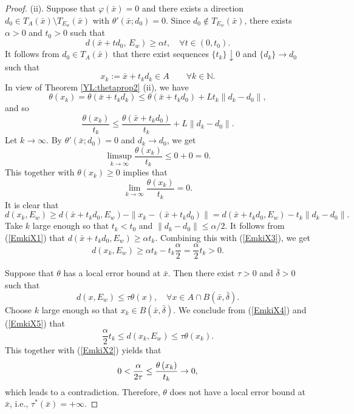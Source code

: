 \documentclass[11pt]{article}
\begin{document}
\begin{proof}
  
  (ii).    Suppose that $	\varphi(\bar{x}) = 0$ and there exists a direction $d_0\in T_A(\bar{x})\setminus T_{E_w}(\bar{x})$ with $\theta'(\bar{x};d_0)=0$. 
  Since $d_0\notin T_{E_w}(\bar{x})$,    there exists  $\alpha>0$ and $t_0>0$ such that
\begin{equation}\label{EmkiX1}
 d(\bar{x}+td_0,\,E_w) \ge \alpha t,    \quad   \forall t\in(0,t_0).
 \end{equation}
It follows from $d_0\in T_A(\bar{x})$ that    there exist sequences $\{t_k\}\downarrow 0$ and $\{d_k\}\to d_0$ such that
  \[
  x_k := \bar{x}+t_k d_k \in A\qquad   \forall k\in\mathbb{N}.  
  \]
   In view of Theorem   \ref{YL:thetaprop2} (ii),  we have
  \[
  \theta(x_k) = \theta(\bar{x}+t_k d_k) \le \theta(\bar{x}+t_k d_0) + L t_k \|d_k - d_0\|,
  \]
and so
  \[
  \frac{\theta(x_k)}{t_k} \le \frac{\theta(\bar{x}+t_k d_0)}{t_k} + L \|d_k - d_0\|.
  \]
  Let $k\to\infty$.  By   $\theta'(\bar{x};d_0)=0$ and $d_k\to d_0$, we get
  \[
  \limsup_{k\to\infty} \frac{\theta(x_k)}{t_k} \le 0 + 0 = 0.
  \]
  This together with $\theta(x_k) \ge 0$   implies that
  \begin{equation}\label{EmkiX2}
  	\lim_{k\to\infty} \frac{\theta(x_k)}{t_k} = 0.
  \end{equation}
    It is clear that
   \begin{equation}\label{EmkiX3}
  d(x_k, E_w) \ge d(\bar{x}+t_k d_0, E_w) - \|x_k - (\bar{x}+t_k d_0)\| = d(\bar{x}+t_k d_0, E_w) - t_k \|d_k - d_0\|.
   \end{equation}
  Take $k$ large enough so that $t_k < t_0$ and $\|d_k - d_0\| \le \alpha/2$.    It follows from  (\ref{EmkiX1})  that  $d(\bar{x}+t_k d_0, E_w) \ge \alpha t_k$.  Combining this with  (\ref{EmkiX3}), we get
   \begin{equation}\label{EmkiX4}
  d(x_k, E_w) \ge \alpha t_k - t_k\frac{\alpha}{2} = \frac{\alpha}{2} t_k > 0.  
   \end{equation}
  
 Suppose that $\theta$ has a  local error bound at $\bar x$.
  Then  there exist $\tau>0$ and $\bar{\delta } >0$ such that
   \begin{equation}\label{EmkiX5}
d(x,E_w)\le \tau\theta(x),   \quad  \forall x\in A\cap B(\bar{x},\bar{\delta }).
 \end{equation}
 Choose $k$ large enough so that $x_k\in B(\bar{x},\bar{\delta })$.   We conclude from  (\ref{EmkiX4})  and  (\ref{EmkiX5})  that
  \[
  \frac{\alpha}{2} t_k \le d(x_k, E_w) \le \tau \theta(x_k) .
  \]
  This together with    (\ref{EmkiX2})    yields   that 
  $$ 0 < {\alpha  \over 2 \tau} \le {{   \theta \left( {{x_k}} \right)} \over {{t_k}}} \to 0,$$
which leads to a contradiction.  Therefore, $\theta$ does not have a local error bound at $\bar{x}$, i.e., $\tau^*(\bar{x}) = +\infty$.
     \end{proof}  
 
\end{document}
